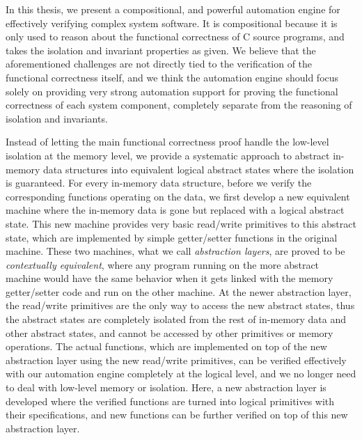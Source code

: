 In this thesis, we present a compositional, and powerful automation engine for effectively
verifying complex system software. It is compositional because it is only used to reason
about the functional correctness of C source programs, and takes the isolation
and invariant properties as given.
We believe that the aforementioned challenges are not directly tied to the verification
of the functional correctness itself, and we think the automation engine should focus solely
on providing
very strong automation support for proving the functional correctness of each system component,
completely separate from the reasoning of isolation and invariants.

Instead of letting the main functional correctness proof handle the low-level
isolation at the memory level,  we provide a systematic approach to abstract in-memory
data structures into equivalent logical abstract states where the isolation is guaranteed.
For every in-memory data structure, before we verify the corresponding functions operating
on the data, we first develop a new equivalent machine where the in-memory data is gone but replaced
with a logical abstract state. This new machine provides very basic read/write primitives to this
abstract state, which are implemented by simple getter/setter functions in the original machine.
These two machines, what we call {\it abstraction layers}, are proved to be {\it contextually equivalent},
where any program running on the more abstract machine would have the same behavior when it gets
linked with the memory getter/setter code and  run on the other machine.
At the newer abstraction layer, the read/write primitives are the only way to access the new abstract
states, thus the abstract states are completely isolated from the rest of in-memory data and other
abstract states, and cannot be accessed by other primitives or memory operations.
The actual functions, which are implemented on top of the new abstraction layer
using the new read/write primitives, can be verified
effectively with our automation engine completely at the logical level, and we no longer need to deal with
low-level memory or isolation. Here, a new abstraction layer is developed where the verified
functions are turned into logical primitives with their specifications, and new functions can be
further verified on top of this new abstraction layer.

